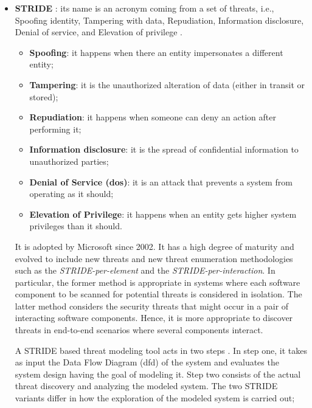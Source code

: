 \begin{itemize}
    \item \textbf{STRIDE} \cite{hernan2006threat, shevchenko2018threat, tuma2018two}: its name is an acronym coming from a set of threats, i.e., Spoofing identity, Tampering with data, Repudiation, Information disclosure, Denial of service, and Elevation of privilege \cite{magin2015security}. 
    \begin{itemize}
        \item \textbf{Spoofing}: it happens when there an entity impersonates a different entity;
        
        \item \textbf{Tampering}: it is the unauthorized alteration of data (either in transit or stored);
        
        \item \textbf{Repudiation}: it happens when someone can deny an action after performing it;
        
        \item \textbf{Information disclosure}: it is  the spread of confidential information to unauthorized parties;
        
        \item \textbf{Denial of Service (\gls{dos})}: it is an attack that prevents a system from operating as it should; 
        
        \item \textbf{Elevation of Privilege}: it happens when an entity gets higher system privileges than it should.
        
    \end{itemize}
    It is adopted by Microsoft since 2002. It has a high degree of maturity and evolved to include new threats and new threat enumeration methodologies such as the \textit{STRIDE-per-element} and the \textit{STRIDE-per-interaction}. In particular, the former method is appropriate in systems where each software component to be scanned for potential threats is considered in isolation. The latter method  considers the security threats that might occur in a pair of interacting software components. Hence, it is more appropriate to discover threats in end-to-end scenarios where several components interact.
   
    A STRIDE based threat modeling tool acts in two steps \cite{khan2017stride}. In step one, it takes as input the Data Flow Diagram (\gls{dfd}) of the system and evaluates the system design having the goal of modeling it. Step two consists of the actual threat discovery and analyzing the modeled system. The two STRIDE variants differ in how the exploration of the modeled system is carried out;


\end{itemize}
